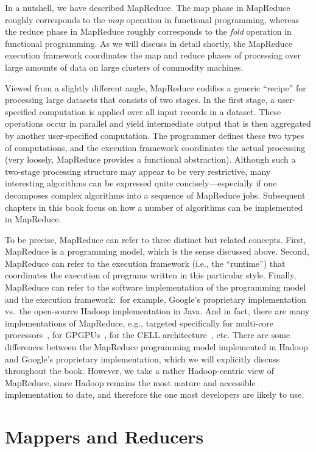 In a nutshell, we have described MapReduce.  The map phase in
MapReduce roughly corresponds to the {\it map} operation in functional
programming, whereas the reduce phase in MapReduce roughly corresponds
to the {\it fold} operation in functional programming.  As we will
discuss in detail shortly, the MapReduce execution framework
coordinates the map and reduce phases of processing over large amounts
of data on large clusters of commodity machines.

Viewed from a slightly different angle, MapReduce codifies a generic
``recipe'' for processing large datasets that consists of two stages.
In the first stage, a user-specified computation is applied over all
input records in a dataset.  These operations occur in parallel and
yield intermediate output that is then aggregated by another
user-specified computation.  The programmer defines these two types of
computations, and the execution framework coordinates the actual
processing (very loosely, MapReduce provides a functional
abstraction).  Although such a two-stage processing structure may
appear to be very restrictive, many interesting algorithms can be
expressed quite concisely---especially if one decomposes complex
algorithms into a sequence of MapReduce jobs.  Subsequent chapters in
this book focus on how a number of algorithms can be implemented in
MapReduce.

To be precise, MapReduce can refer to three distinct but related
concepts.  First, MapReduce is a programming model, which is the sense
discussed above.  Second, MapReduce can refer to the execution
framework (i.e., the ``runtime'') that coordinates the execution of
programs written in this particular style.  Finally, MapReduce can
refer to the software implementation of the programming model and the
execution framework:\ for example, Google's proprietary implementation
vs.\ the open-source Hadoop implementation in Java.  And in fact,
there are many implementations of MapReduce, e.g., targeted
specifically for multi-core processors~\cite{Ranger_etal_2007}, for
GPGPUs~\cite{HeB_etal_2008}, for the CELL
architecture~\cite{Rafique_etal_2009}, etc.  There are some
differences between the MapReduce programming model implemented in
Hadoop and Google's proprietary implementation, which we will
explicitly discuss throughout the book.  However, we take a rather
Hadoop-centric view of MapReduce, since Hadoop remains the most mature
and accessible implementation to date, and therefore the one most
developers are likely to use.

\section{Mappers and Reducers}
\label{chapter2:mappers-and-reducers}

